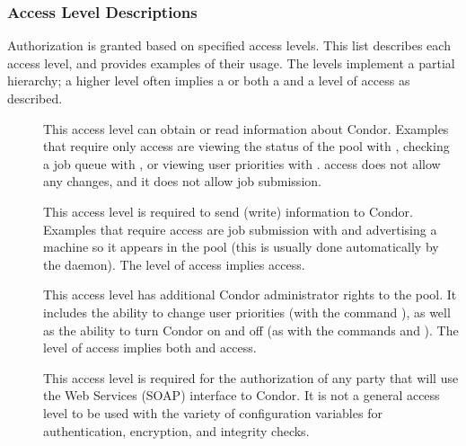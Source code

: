 \subsubsection{\label{sec:Security-access-levels}Access Level Descriptions}
Authorization is granted based on specified access levels.
This list describes each access level,
and provides examples of their usage.
The levels implement a partial hierarchy;  a higher level often implies
a  or both a 
 and a  level of access as described.

\begin{description}

\item[] \label{sec-level-read} This access level
   can obtain or read information about Condor.
   Examples that require only  access are
   viewing the status of the pool with , 
   checking a job queue with ,
   or viewing user priorities with .
    access does not allow any
   changes, and it does not allow job submission.

\item[] \label{sec-level-write} This access level is
   required to send (write) information to Condor. Examples that
   require  access are job submission with
    and advertising a machine so it appears in the pool
   (this is usually done automatically by the  daemon).
   The  level of access implies  access. 

\item[] \label{sec-level-administrator} This
   access level has additional Condor
   administrator rights to the pool.  It includes the ability to
   change user priorities (with the command ),
   as well as the ability to turn Condor on and off
   (as with the commands  and ).
   The  level of access implies both
    and  access.

\item[] \label{sec-level-soap} This
   access level is required for the authorization of any party that will 
   use the Web Services (SOAP) interface to Condor.
   It is not a general access level to be used with the variety
   of configuration variables for authentication, encryption,
   and integrity checks.


\end{description}
